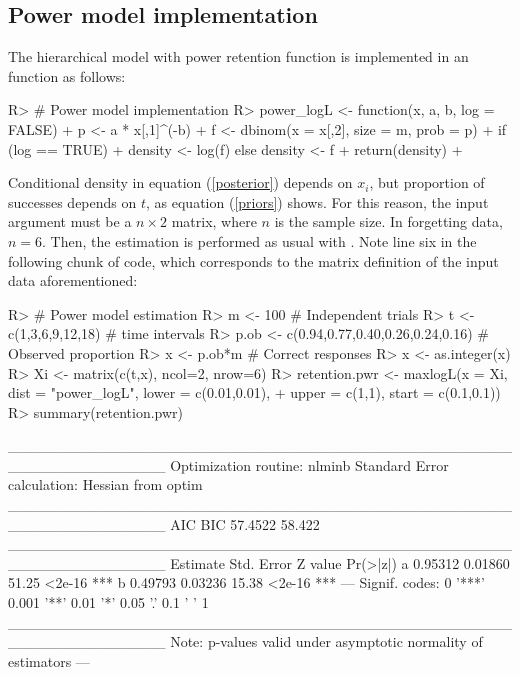 \documentclass[nojss]{jss}
\begin{document}
\subsection*{Power model implementation}

The hierarchical model with power retention function is implemented in an  function as follows:

\begin{Schunk}
\begin{Sinput}
R> # Power model implementation
R> power_logL <- function(x, a, b, log = FALSE){
+    p <- a * x[,1]^(-b)
+    f <- dbinom(x = x[,2], size = m, prob = p)
+    if (log == TRUE)
+      density <- log(f) else density <- f
+    return(density)
+  }
\end{Sinput}
\end{Schunk}

Conditional density in equation (\ref{posterior}) depends on $x_i$, but proportion of successes depends on $t$, as equation (\ref{priors}) shows. For this reason, the input argument  must be a $n\times 2$ matrix, where $n$ is the sample size. In forgetting data, $n=6$. Then, the estimation is performed as usual with . Note line six in the following chunk of code, which corresponds to the matrix definition of the input data aforementioned:

\begin{Schunk}
\begin{Sinput}
R> # Power model estimation
R> m <- 100 # Independent trials
R> t <- c(1,3,6,9,12,18) # time intervals
R> p.ob <- c(0.94,0.77,0.40,0.26,0.24,0.16) # Observed proportion
R> x <- p.ob*m # Correct responses
R> x <- as.integer(x)
R> Xi <- matrix(c(t,x), ncol=2, nrow=6)
R> retention.pwr <- maxlogL(x = Xi, dist = "power_logL", lower = c(0.01,0.01),
+                           upper = c(1,1), start = c(0.1,0.1))
R> summary(retention.pwr)
\end{Sinput}
\begin{Soutput}
_______________________________________________________________
Optimization routine: nlminb 
Standard Error calculation: Hessian from optim 
_______________________________________________________________
      AIC    BIC
  57.4522 58.422
_______________________________________________________________
  Estimate  Std. Error Z value Pr(>|z|)    
a   0.95312    0.01860   51.25   <2e-16 ***
b   0.49793    0.03236   15.38   <2e-16 ***
---
Signif. codes:  0 '***' 0.001 '**' 0.01 '*' 0.05 '.' 0.1 ' ' 1
_______________________________________________________________
Note: p-values valid under asymptotic normality of estimators 
---
\end{Soutput}
\end{Schunk}
\end{document}
